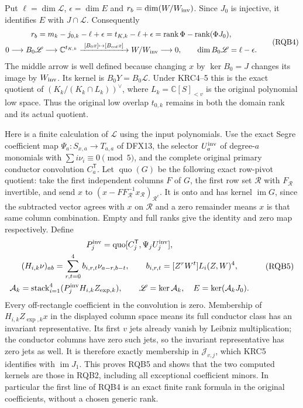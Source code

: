 \documentclass[11pt,a4paper]{article}
\begin{document}
Put $\ell=\dim\mathscr L$, $\epsilon=\dim E$ and $r_b=\dim(W/W_{\rm inv})$.
Since $J_0$ is injective, it identifies $E$ with $J\cap\mathscr L$.
Consequently
\[
\begin{gathered}
 r_b=m_k-j_{0,k}-\ell+\epsilon
    =t_{K,k}-\ell+\epsilon
    =\operatorname{rank}\Phi-\operatorname{rank}(\Phi J_0),\\
 0\longrightarrow B_0\mathscr L
   \longrightarrow\mathbb C^{t_{K,k}}
   \xrightarrow{\ [B_0x]\mapsto[B_{\rm cof}x]\ }W/W_{\rm inv}
   \longrightarrow0,\qquad
 \dim B_0\mathscr L=\ell-\epsilon .
\end{gathered}\tag{RQB4}
\]
The middle arrow is well defined because changing $x$ by $\ker B_0=J$
changes its image by $W_{\rm inv}$. Its kernel is $B_0Y=B_0\mathscr L$.
Under KRC4--5 this is the exact quotient of
$(K_k/(K_k\cap L_k))^\vee$, where $L_k=\mathbb C[S]_{<v}$ is
the original polynomial low space. Thus the original low overlap
$t_{0,k}$ remains in both the domain rank and its actual quotient.

Here is a finite calculation of $\mathscr L$ using the input polynomials.
Use the exact Segre coefficient map
$\Psi_a:S_{x,a}\to T_{a,a}$ of DFX13, the selector $U_a^{\rm inv}$
of degree-$a$ monomials with $\sum i\nu_i\equiv0\pmod5$, and the
complete original primary conductor convolution $C_a^{\mathsf T}$.
Let $\operatorname{quo}(G)$ be the following exact row-pivot quotient:
take the first independent columns $F$ of $G$, the first row set
$\mathcal R$ with $F_{\mathcal R}$ invertible, and send
$x$ to $(x-FF_{\mathcal R}^{-1}x_{\mathcal R})_{\mathcal R^c}$.
It is onto and has kernel $\operatorname{im}G$, since the subtracted
vector agrees with $x$ on $\mathcal R$ and a zero remainder means
$x$ is that same column combination. Empty and full ranks give the
identity and zero map respectively. Define
\[
\begin{gathered}
 P_j^{\rm inv}=\operatorname{quo}
       [C_j^{\mathsf T},\Psi_j U_j^{\rm inv}],\\
 (H_{i,k}\nu)_{ab}=\sum_{r,t=0}^4b_{i,r,t}\nu_{a-r,b-t},\qquad
 b_{i,r,t}=[Z^rW^t]L_i(Z,W)^4,\\
 \mathcal A_k=\operatorname{stack}_{i=1}^4
                 (P_j^{\rm inv}H_{i,k}Z_{\exp,k}),\qquad
 \mathscr L=\ker\mathcal A_k,\quad E=\ker(\mathcal A_kJ_0).
\end{gathered}\tag{RQB5}
\]
Every off-rectangle coefficient in the convolution is zero. Membership
of $H_{i,k}Z_{\exp,k}x$ in the displayed column space means its full
conductor class has an invariant representative. Its first $v$ jets
already vanish by Leibniz multiplication; the conductor columns have
zero such jets, so the invariant representative has zero jets as well.
It is therefore exactly membership in $\mathscr J_{v,j}$, which
KRC5 identifies with $\operatorname{im}J_1$. This proves RQB5 and
shows that the two computed kernels are those in RQB2, including all
exceptional coefficient minors. In particular the first line of RQB4
is an exact finite rank formula in the original coefficients, without
a chosen generic rank.
\end{document}
